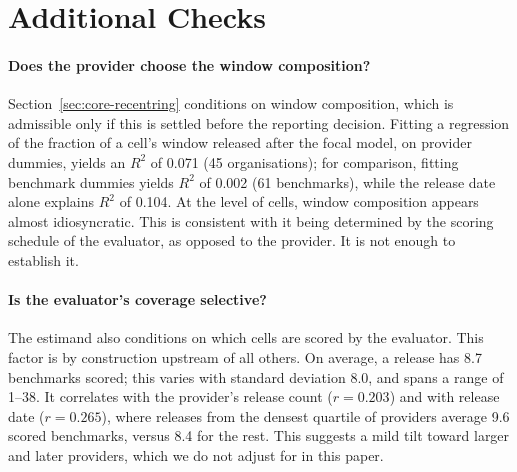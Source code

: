 \section{Additional Checks}\label{sec:supporting}

\paragraph{Does the provider choose the window composition?}
Section~\ref{sec:core-recentring} conditions on window composition, which is admissible only if this is settled before the reporting decision. Fitting a regression of the fraction of a cell's window released after the focal model, on provider dummies, yields an $R^2$ of 0.071 (45 organisations); for comparison, fitting benchmark dummies yields $R^2$ of 0.002 (61 benchmarks), while the release date alone explains $R^2$ of 0.104. At the level of cells, window composition appears almost idiosyncratic. This is consistent with it being determined by the scoring schedule of the evaluator, as opposed to the provider. It is not enough to establish it.

\paragraph{Is the evaluator's coverage selective?}
The estimand also conditions on which cells are scored by the evaluator. This factor is by construction upstream of all others. On average, a release has 8.7 benchmarks scored; this varies with standard deviation 8.0, and spans a range of 1--38. It correlates with the provider's release count ($r = 0.203$) and with release date ($r = 0.265$), where releases from the densest quartile of providers average 9.6 scored benchmarks, versus 8.4 for the rest. This suggests a mild tilt toward larger and later providers, which we do not adjust for in this paper.

